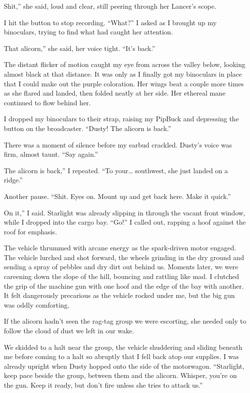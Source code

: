 \leavevmode{}Shit,” she said, loud and clear, still peering through her Lancer’s scope.

I hit the button to stop recording. “What?” I asked as I brought up my binoculars, trying to find what had caught her attention.

\leavevmode{}That alicorn,” she said, her voice tight. “It’s back.”

The distant flicker of motion caught my eye from across the valley below, looking almost black at that distance. It was only as I finally got my binoculars in place that I could make out the purple coloration. Her wings beat a couple more times as she flared and landed, then folded neatly at her side. Her ethereal mane continued to flow behind her.

I dropped my binoculars to their strap, raising my PipBuck and depressing the button on the broadcaster. “Dusty! The alicorn is back.”

There was a moment of silence before my earbud crackled. Dusty’s voice was firm, almost taunt. “Say again.”

\leavevmode{}The alicorn is back,” I repeated. “To your… southwest, she just landed on a ridge.”

Another pause. “Shit. Eyes on. Mount up and get back here. Make it quick.”

\leavevmode{}On it,” I said. Starlight was already slipping in through the vacant front window, while I dropped into the cargo bay. “Go!” I called out, rapping a hoof against the roof for emphasis.

The vehicle thrummed with arcane energy as the spark-driven motor engaged. The vehicle lurched and shot forward, the wheels grinding in the dry ground and sending a spray of pebbles and dry dirt out behind us. Moments later, we were careening down the slope of the hill, bouncing and rattling like mad. I clutched the grip of the machine gun with one hoof and the edge of the bay with another. It felt dangerously precarious as the vehicle rocked under me, but the big gun was oddly comforting.

If the alicorn hadn’t seen the rag-tag group we were escorting, she needed only to follow the cloud of dust we left in our wake.

We skidded to a halt near the group, the vehicle shuddering and sliding beneath me before coming to a halt so abruptly that I fell back atop our supplies. I was already upright when Dusty hopped onto the side of the motorwagon. “Starlight, keep pace beside the group, between them and the alicorn. Whisper, you’re on the gun. Keep it ready, but don’t fire unless she tries to attack us.”

